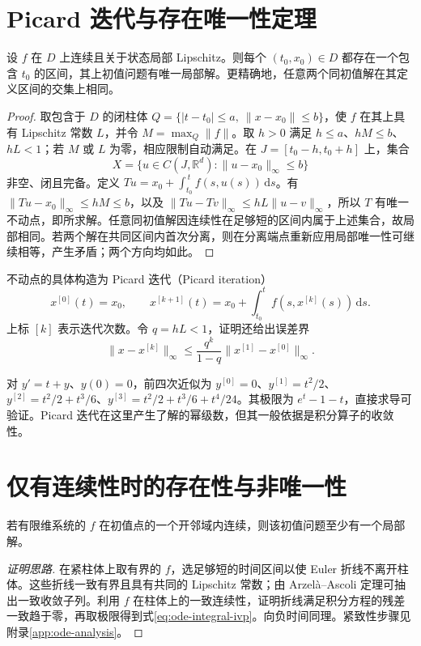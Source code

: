 \section{Picard 迭代与存在唯一性定理}
\begin{theorem}
\label{thm:ode-picard}
设 $f$ 在 $D$ 上连续且关于状态局部 Lipschitz。则每个 $(t_0,x_0)\in D$ 都存在一个包含 $t_0$ 的区间，其上初值问题有唯一局部解。更精确地，任意两个同初值解在其定义区间的交集上相同。
\end{theorem}
\begin{proof}
取包含于 $D$ 的闭柱体 $Q=\{|t-t_0|\leq a,\ \|x-x_0\|\leq b\}$，使 $f$ 在其上具有 Lipschitz 常数 $L$，并令 $M=\max_Q\|f\|$。取 $h>0$ 满足 $h\leq a$、$hM\leq b$、$hL<1$；若 $M$ 或 $L$ 为零，相应限制自动满足。在 $J=[t_0-h,t_0+h]$ 上，集合
\[
 X=\{u\in C(J,\mathbb R^d):\|u-x_0\|_\infty\leq b\}
\]
非空、闭且完备。定义 $Tu=x_0+\int_{t_0}^{\,t}f(s,u(s))\,\mathrm ds$。有 $\|Tu-x_0\|_\infty\leq hM\leq b$，以及 $\|Tu-Tv\|_\infty\leq hL\|u-v\|_\infty$，所以 $T$ 有唯一不动点，即所求解。任意同初值解因连续性在足够短的区间内属于上述集合，故局部相同。若两个解在共同区间内首次分离，则在分离端点重新应用局部唯一性可继续相等，产生矛盾；两个方向均如此。
\end{proof}

不动点的具体构造为 Picard 迭代（Picard iteration）
\[
 x^{[0]}(t)=x_0,\qquad x^{[k+1]}(t)=x_0+\int_{t_0}^t f(s,x^{[k]}(s))\,\mathrm ds.
\]
上标 $[k]$ 表示迭代次数。令 $q=hL<1$，证明还给出误差界
\[
 \|x-x^{[k]}\|_\infty\leq\frac{q^k}{1-q}\|x^{[1]}-x^{[0]}\|_\infty.
\]

\begin{example}
对 $y'=t+y$、$y(0)=0$，前四次近似为 $y^{[0]}=0$、$y^{[1]}=t^2/2$、$y^{[2]}=t^2/2+t^3/6$、$y^{[3]}=t^2/2+t^3/6+t^4/24$。其极限为 $e^t-1-t$，直接求导可验证。Picard 迭代在这里产生了解的幂级数，但其一般依据是积分算子的收敛性。
\end{example}

\section{仅有连续性时的存在性与非唯一性}
\begin{theorem}
若有限维系统的 $f$ 在初值点的一个开邻域内连续，则该初值问题至少有一个局部解。
\end{theorem}
\begin{proof}[证明思路]
在紧柱体上取有界的 $f$，选足够短的时间区间以使 Euler 折线不离开柱体。这些折线一致有界且具有共同的 Lipschitz 常数；由 Arzelà--Ascoli 定理可抽出一致收敛子列。利用 $f$ 在柱体上的一致连续性，证明折线满足积分方程的残差一致趋于零，再取极限得到式\eqref{eq:ode-integral-ivp}。向负时间同理。紧致性步骤见附录\ref{app:ode-analysis}。
\end{proof}

